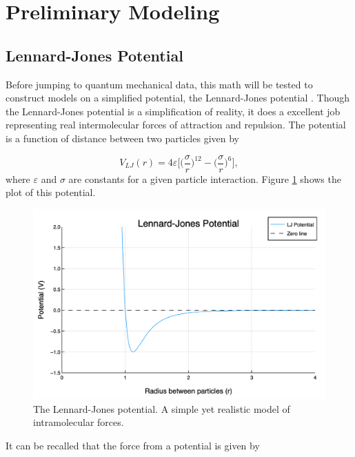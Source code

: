\section{Preliminary Modeling}\label{Sect:modelPrep}

\subsection{Lennard-Jones Potential}\label{Sect:LJPotential}
Before jumping to quantum mechanical data, this math will be tested to construct models on a simplified potential, the Lennard-Jones potential \cite{LJ-potential}. Though the Lennard-Jones potential is a simplification of reality, it does a excellent job representing real intermolecular forces of attraction and repulsion. The potential is a function of distance between two particles given by

\begin{equation} \label{eq:LJ}
V_{LJ}(r) = 4\varepsilon \bigg[\Big(\frac{\sigma}{r}\Big)^{12} - \Big(\frac{\sigma}{r}\Big)^6\bigg],
\end{equation}
where $\varepsilon$ and $\sigma$ are constants for a given particle interaction. Figure \ref{fig:LJ} shows the plot of this potential.

\begin{figure}[h]
\includegraphics[scale = 0.4]{Figures/LJPotential}
\caption{The Lennard-Jones potential. A simple yet realistic model of intramolecular forces.
\label{fig:LJ}} 
\end{figure}

\par It can be recalled that the force from a potential is given by

